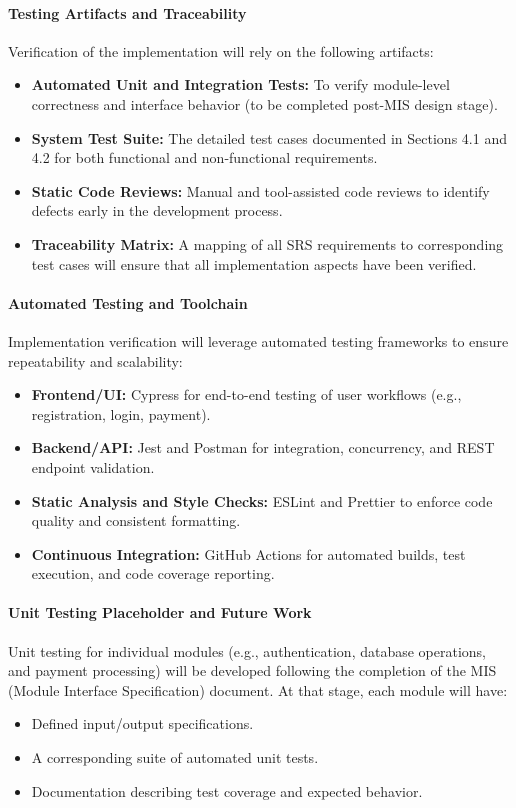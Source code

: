 \documentclass[12pt, titlepage]{article}
\begin{document}
\paragraph{Testing Artifacts and Traceability}
\noindent \newline
Verification of the implementation will rely on the following artifacts:
\begin{itemize}
    \item \textbf{Automated Unit and Integration Tests:} To verify module-level correctness and interface behavior (to be completed post-MIS design stage).
    \item \textbf{System Test Suite:} The detailed test cases documented in Sections 4.1 and 4.2 for both functional and non-functional requirements.
    \item \textbf{Static Code Reviews:} Manual and tool-assisted code reviews to identify defects early in the development process.
    \item \textbf{Traceability Matrix:} A mapping of all SRS requirements to corresponding test cases will ensure that all implementation aspects have been verified.
\end{itemize}

\paragraph{Automated Testing and Toolchain}
\noindent \newline
Implementation verification will leverage automated testing frameworks to ensure repeatability and scalability:
\begin{itemize}
    \item \textbf{Frontend/UI:} Cypress for end-to-end testing of user workflows (e.g., registration, login, payment).
    \item \textbf{Backend/API:} Jest and Postman for integration, concurrency, and REST endpoint validation.
    \item \textbf{Static Analysis and Style Checks:} ESLint and Prettier to enforce code quality and consistent formatting.
    \item \textbf{Continuous Integration:} GitHub Actions for automated builds, test execution, and code coverage reporting.
\end{itemize}

\paragraph{Unit Testing Placeholder and Future Work}
\noindent \newline
Unit testing for individual modules (e.g., authentication, database operations, and payment processing) will be developed following the completion of the MIS (Module Interface Specification) document. At that stage, each module will have:
\begin{itemize}
    \item Defined input/output specifications.
    \item A corresponding suite of automated unit tests.
    \item Documentation describing test coverage and expected behavior.
\end{itemize}
\end{document}
